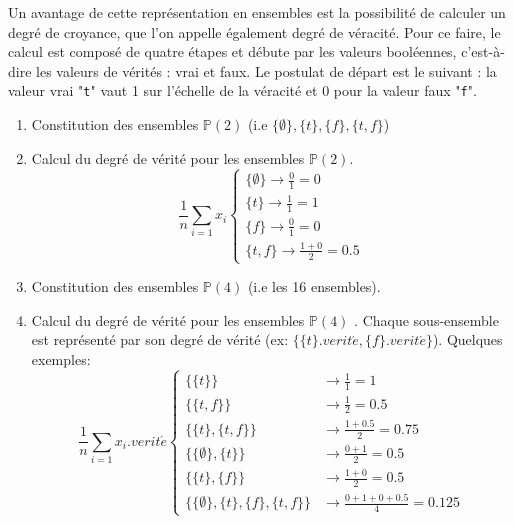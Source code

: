 \begin{refsegment}
Un avantage de cette représentation en ensembles est la possibilité de calculer un degré de croyance, que l'on appelle également degré de véracité. Pour ce faire, le calcul est composé de quatre étapes et débute par les valeurs booléennes, c'est-à-dire les valeurs de vérités : vrai et faux. Le postulat de départ est le suivant : la valeur vrai "\texttt{t}"  vaut 1 sur l'échelle de la véracité et 0 pour la valeur faux "\texttt{f}".

\begin{enumerate}
    \item Constitution des ensembles $\mathbb{P}(2)$ (i.e $\{\emptyset\},\{t\},\{f\},\{t,f\}$)
    \item Calcul du degré de vérité pour les ensembles  $\mathbb{P}(2)$.
    \begin{equation*}
    \frac{1}{n} \sum_{i=1}x_{i}
    \begin{cases}
    \{\emptyset\} \to \frac{0}{1} = 0 \\
    \{t\} \to \frac{1}{1} = 1 \\
    \{f\} \to \frac{0}{1} = 0 \\
    \{t,f\} \to \frac{1+0}{2} = 0.5
    \end{cases}
    \end{equation*}
    \item Constitution des ensembles $\mathbb{P}(4)$ (i.e les 16 ensembles).
    \item Calcul du degré de vérité pour les ensembles  $\mathbb{P}(4)$ . Chaque sous-ensemble est représenté par son degré de vérité (ex: $\{\{t\}.verit\acute{e},\{f\}.verit\acute{e}\}$). Quelques exemples:
    \begin{equation*}
    \frac{1}{n} \sum_{i=1}x_{i}.verit\acute{e}
    \begin{cases}
    \{\{t\}\}                               &\to \frac{1}{1} = 1 \\
    \{\{t,f\}\}                             &\to \frac{1}{2} = 0.5 \\
    \{\{t\},\{t,f\}\}                       &\to \frac{1+0.5}{2} = 0.75 \\
    \{\{\emptyset\},\{t\}\}                 &\to \frac{0+1}{2} = 0.5 \\
    \{\{t\},\{f\}\}                         &\to \frac{1+0}{2} = 0.5 \\
    \{\{\emptyset\},\{t\},\{f\},\{t,f\}\}   &\to \frac{0+1+0+0.5}{4} = 0.125
    \end{cases}
    \end{equation*}
\end{enumerate}


\end{refsegment}
